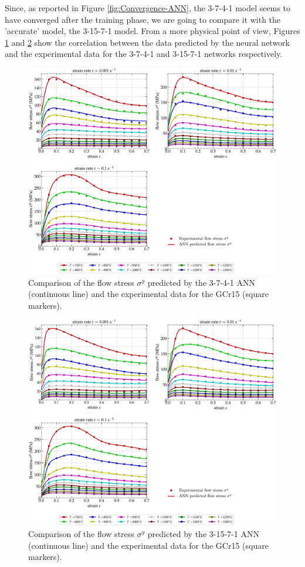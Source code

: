 \documentclass[algorithms,article,submit,pdftex,moreauthors]{Definitions/mdpi}
\begin{document}
Since, as reported in Figure \ref{fig:Convergence-ANN}, the 3-7-4-1 model seems to have converged after the training phase, we are going to compare it with the 'accurate' model, the 3-15-7-1 model.
From a more physical point of view, Figures \ref{fig:CompExpANN-9-4} and \ref{fig:CompExpANN-15-7} show the correlation between the data predicted by the neural network and the experimental data for the 3-7-4-1 and 3-15-7-1 networks respectively.
\begin{figure}[!ht]
\centering
\includegraphics[width=\columnwidth]{Figures/CompExpANN-3-7-4-1}
\caption{Comparison of the flow stress $\sigma^y$ predicted by the 3-7-4-1 ANN (continuous line) and the experimental data for the GCr15 (square markers).}
\label{fig:CompExpANN-9-4}
\end{figure}
\begin{figure}[!ht]
\centering
\includegraphics[width=\columnwidth]{Figures/CompExpANN-3-15-7-1}
\caption{Comparison of the flow stress $\sigma^y$ predicted by the 3-15-7-1 ANN (continuous line) and the experimental data for the GCr15 (square markers).}
\label{fig:CompExpANN-15-7}
\end{figure}
\end{document}
